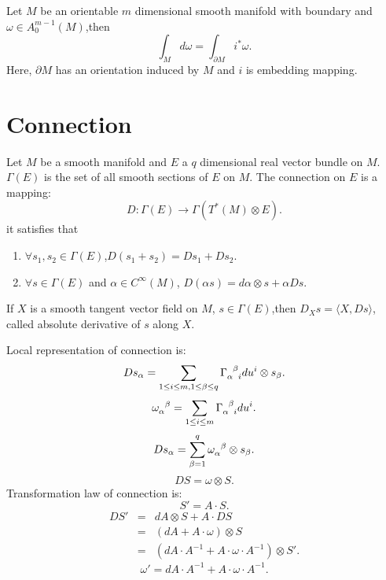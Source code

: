 \begin{newthem} 
Let $M$ be an orientable $m$ dimensional smooth manifold with boundary and $\omega \in A_0^{m-1}(M)$,then
\[\int_{M} d\omega = \int_{\partial M} i^* \omega.\]
Here, $\partial M$ has an orientation induced by $M$ and $i$ is  embedding mapping.
\end{newthem}

\section{Connection}
\begin{newdef}[Connection] 
Let $M$ be a smooth manifold and $E$ a $q$ dimensional real vector bundle on $M$. $\Gamma(E)$ is the set of all smooth sections of $E$ on $M$. The connection on $E$ is a mapping:
\[D:\Gamma(E) \to \Gamma(T^*(M) \otimes E).\]
it satisfies that
\begin{enumerate}
\item $\forall s_1 ,s_2 \in \Gamma(E)$,$D(s_1+s_2) = Ds_1+Ds_2$.
\item $\forall s \in \Gamma(E)$ and $\alpha \in C^{\infty}(M)$, $D(\alpha s) = d\alpha \otimes s + \alpha Ds$.
\end{enumerate}
If $X$ is a smooth tangent vector field on $M$, $s \in \Gamma(E)$,then
$D_{X}s = \langle X, Ds \rangle$, called absolute derivative of $s$ along $X$.
\end{newdef}

\vspace{50pt}

\begin{newprop}
Local representation of connection is: 
\[Ds_{\alpha} = \sum_{1 \leq i \leq m,1 \leq \beta \leq q} \tensor{\Gamma}{_\alpha^\beta_i} du^i \otimes s_{\beta}.\]
\[\tensor{\omega}{_\alpha^\beta} = \sum_{1 \leq i \leq m} \tensor{\Gamma}{_\alpha^\beta_i} du^i.\]
\[Ds_{\alpha} = \sum_{\beta=1}^{q} \tensor{\omega}{_\alpha^\beta} \otimes s_{\beta}.\]
\[DS = \omega \otimes S.\]
Transformation law of connection is:
\[S' = A \cdot S.\] 
\begin{eqnarray}
DS' &=& dA \otimes S + A \cdot DS \nonumber \\
&=& (dA + A \cdot \omega) \otimes S \nonumber \\
&=& (dA \cdot A^{-1} + A \cdot \omega \cdot A^{-1}) \otimes S' .\nonumber
\end{eqnarray}
\[\omega' = dA \cdot A^{-1} + A \cdot \omega \cdot A^{-1}.\]
\end{newprop}

